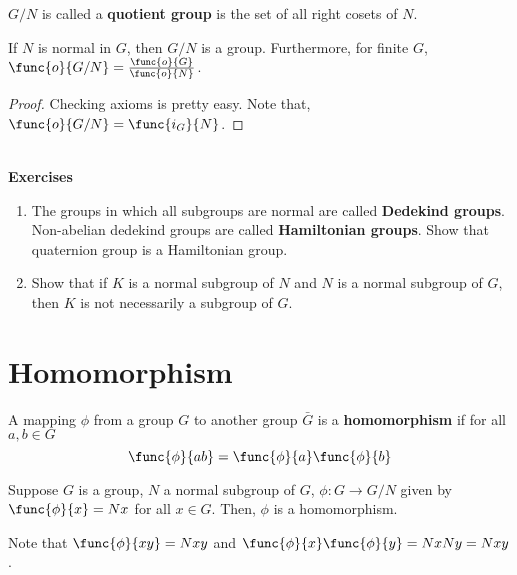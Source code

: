 \begin{definition}
    \(G/N\) is called a \textbf{quotient group} is the set of all right cosets of \(N\).
\end{definition}

\begin{theorem}
    If \(N\) is normal in \(G\), then \(G/N\) is a group. Furthermore, for finite \(G\), \(\func{o}{G/N} = \frac{\func{o}{G}}{\func{o}{N}}\).
\end{theorem}

\begin{proof}
    Checking axioms is pretty easy. Note that, \(\func{o}{G/N} = \func{i_G}{N}\).
\end{proof}
\ \\ 
{\Large{\textbf{Exercises}}}
\begin{enumerate}
    \item The groups in which all subgroups are normal are called \textbf{Dedekind groups}. Non-abelian dedekind groups are called \textbf{Hamiltonian groups}. Show that quaternion group is a Hamiltonian group.
    \item Show that if \(K\) is a normal subgroup of \(N\) and \(N\) is a normal subgroup of \(G\), then \(K\) is not necessarily a subgroup of \(G\).
\end{enumerate}

\section{Homomorphism}
\begin{definition}
    A mapping \(\phi\) from a group \(G\) to another group \(\bar{G}\) is a \textbf{homomorphism} if for all \(a,b \in G\)
    \begin{equation*}
        \func{\phi}{ab} = \func{\phi}{a} \func{\phi}{b}
    \end{equation*}
\end{definition}

\begin{lemma}
    Suppose \(G\) is a group, \(N\) a normal subgroup of \(G\), \(\phi: G \to G/N\) given by \(\func{\phi}{x} = Nx\) for all \(x \in G\). Then, \(\phi\) is a homomorphism.
\end{lemma}

\begin{prooflemma}
    Note that \(\func{\phi}{xy} = Nxy\) and \(\func{\phi}{x} \func{\phi}{y} = NxNy = Nxy\).
\end{prooflemma}

